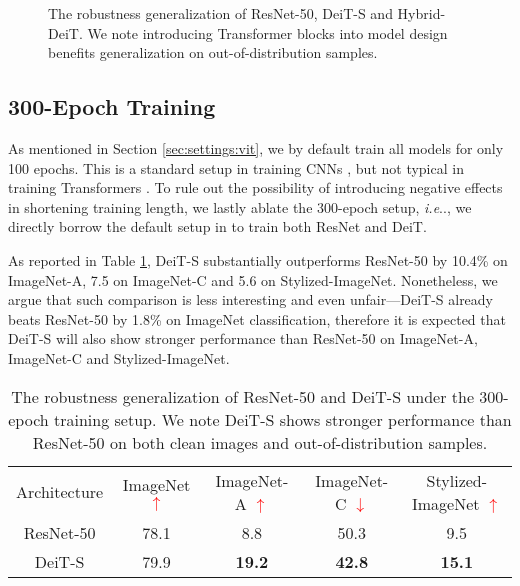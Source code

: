 \documentclass{article}
\makeatletter
\DeclareRobustCommand\onedot{\futurelet\@let@token\@onedot}
\def\@onedot{\ifx\@let@token.\else.\null\fi\xspace}
\def\ie{\emph{i.e}\onedot} \def\Ie{\emph{I.e}\onedot}
\makeatother
\begin{document}
\begin{figure}[h!]
\centering
\vspace{-0.3em}
\vspace{-0.5em}
    \caption{The robustness generalization of ResNet-50, DeiT-S and Hybrid-DeiT. We note introducing Transformer blocks into model design benefits generalization on out-of-distribution samples.}
    \label{fig:hybrid}
    \vspace{-0.2em}
\end{figure}



\subsection{300-Epoch Training}
As mentioned in Section \ref{sec:settings:vit}, we by default train all models for only 100 epochs. This is a standard setup in training CNNs \cite{goyal2017accurate,radosavovic2020designing}, but not typical in training Transformers \cite{pmlr-v139-touvron21a,liu2021swin}. To rule out the possibility of introducing negative effects in shortening training length, we lastly ablate the 300-epoch setup, \ie, we directly borrow the default  setup in \cite{pmlr-v139-touvron21a} to train both ResNet and DeiT.

As reported in Table \ref{tab:same}, DeiT-S substantially outperforms ResNet-50 by 10.4\% on ImageNet-A, 7.5 on ImageNet-C and 5.6 on Stylized-ImageNet. Nonetheless, we argue that such comparison is less interesting and even unfair---DeiT-S already beats ResNet-50 by 1.8\% on ImageNet classification, therefore it is expected that DeiT-S will also show stronger performance than ResNet-50 on ImageNet-A, ImageNet-C and Stylized-ImageNet.


\begin{table}[!ht]
\footnotesize
\centering
\vspace{-0.4em}
\caption{The robustness generalization of ResNet-50 and DeiT-S under the 300-epoch training setup. We note DeiT-S shows stronger performance than ResNet-50 on both clean images and out-of-distribution samples.}
\begin{tabular}{c|c|c|c|c}
\shline
 Architecture & ImageNet \textcolor{red}{$\uparrow$} & ImageNet-A \textcolor{red}{$\uparrow$}& ImageNet-C \textcolor{red}{$\downarrow$}& Stylized-ImageNet \textcolor{red}{$\uparrow$}\\ 
 \shline
 ResNet-50  &  78.1	& 8.8	& 50.3	& 9.5   \\  
 DeiT-S &  79.9	& \textbf{19.2} & 	\textbf{42.8} & 	\textbf{15.1}    \\ \hline 
\end{tabular}
\vspace{-0.1em}
\label{tab:same}
\end{table}
\end{document}
